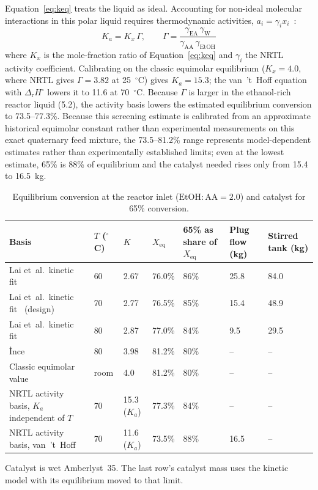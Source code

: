 \documentclass[10pt,a4paper]{article}
\newcommand{\hdrrow}{}
\newcommand{\tabnote}[1]{\par\vspace{2pt}\begin{minipage}{\textwidth}\justifying\footnotesize #1\end{minipage}}
\begin{document}
Equation~\eqref{eq:keq} treats the liquid as ideal. Accounting for non-ideal molecular interactions in this polar liquid requires thermodynamic activities, $a_i = \gamma_i x_i$~\cite{ref11}:
\begin{equation}
K_a = K_x\,\Gamma, \qquad \Gamma = \frac{\gamma_{\mathrm{EA}}\,\gamma_{\mathrm{W}}}{\gamma_{\mathrm{AA}}\,\gamma_{\mathrm{EtOH}}}
\label{eq:ka}
\end{equation}
where $K_x$ is the mole-fraction ratio of Equation~\eqref{eq:keq} and $\gamma_i$ the NRTL activity coefficient. Calibrating on the classic equimolar equilibrium ($K_x = 4.0$, where NRTL gives $\Gamma = 3.82$ at 25~$^\circ$C) gives $K_a = 15.3$; the van~'t~Hoff equation with $\Delta_{\mathrm{r}}H^\circ$ lowers it to 11.6 at 70~$^\circ$C. Because $\Gamma$ is larger in the ethanol-rich reactor liquid (5.2), the activity basis lowers the estimated equilibrium conversion to 73.5--77.3\%. Because this screening estimate is calibrated from an approximate historical equimolar constant rather than experimental measurements on this exact quaternary feed mixture, the 73.5--81.2\% range represents model-dependent estimates rather than experimentally established limits; even at the lowest estimate, 65\% is 88\% of equilibrium and the catalyst needed rises only from 15.4 to 16.5~kg.

\begin{table}[H]
\centering
\caption{Equilibrium conversion at the reactor inlet ($\mathrm{EtOH:AA} = 2.0$) and catalyst for 65\% conversion.}
\label{tab:eq_cat}
\small
\begin{tabularx}{\textwidth}{|Y|C{1.1cm}|R{1.6cm}|R{1.2cm}|R{1.6cm}|R{1.4cm}|R{1.4cm}|}
\hline
\hdrrow
\textbf{Basis} & \textbf{$T$ ($^\circ$C)} & \textbf{$K$} & \textbf{$X_{\mathrm{eq}}$} & \textbf{65\% as share of $X_{\mathrm{eq}}$} & \textbf{Plug flow (kg)} & \textbf{Stirred tank (kg)} \\
\hline
Lai et~al.\ kinetic fit~\cite{ref7} & 60 & 2.67 & 76.0\% & 86\% & 25.8 & 84.0 \\
\hline
Lai et~al.\ kinetic fit~\cite{ref7} (design) & 70 & 2.77 & 76.5\% & 85\% & 15.4 & 48.9 \\
\hline
Lai et~al.\ kinetic fit~\cite{ref7} & 80 & 2.87 & 77.0\% & 84\% & 9.5 & 29.5 \\
\hline
\.{I}nce~\cite{ref9} & 80 & 3.98 & 81.2\% & 80\% & -- & -- \\
\hline
Classic equimolar value~\cite{ref10} & room & 4.0 & 81.2\% & 80\% & -- & -- \\
\hline
NRTL activity basis, $K_a$ independent of $T$ & 70 & 15.3 ($K_a$) & 77.3\% & 84\% & -- & -- \\
\hline
NRTL activity basis, van~'t~Hoff & 70 & 11.6 ($K_a$) & 73.5\% & 88\% & 16.5 & -- \\
\hline
\end{tabularx}
\tabnote{Catalyst is wet Amberlyst~35. The last row's catalyst mass uses the kinetic model with its equilibrium moved to that limit.}
\end{table}
\end{document}
